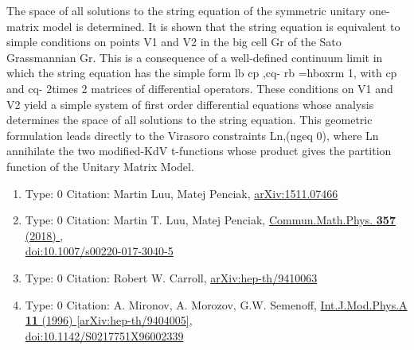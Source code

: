 \documentclass[a4paper,10pt]{article}
\begin{document}
\begin{enumerate}
The space of all solutions to the string equation of the symmetric unitary one-matrix model is determined. It is shown that the string equation is equivalent to simple conditions on points V1 and V2 in the big cell Gr of the Sato Grassmannian Gr. This is a consequence of a well-defined continuum limit in which the string equation has the simple form lb cp ,cq- rb =hbox{rm 1}, with cp and cq- 2times 2 matrices of differential operators. These conditions on V1 and V2 yield a simple system of first order differential equations whose analysis determines the space of all solutions to the string equation. This geometric formulation leads directly to the Virasoro constraints Ln,(ngeq 0), where Ln annihilate the two modified-KdV t-functions whose product gives the partition function of the Unitary Matrix Model.
\begin{enumerate}
  \item Type: 0 Citation: Martin Luu, Matej Penciak, \href{https://arxiv.org/abs/1511.07466}{arXiv:1511.07466}
  \item Type: 0 Citation: Martin T. Luu, Matej Penciak, \href{https://www.doi.org/10.1007/s00220-017-3040-5}{Commun.Math.Phys. {\bf 357} (2018) },\\\href{https://www.doi.org/10.1007/s00220-017-3040-5}{doi:10.1007/s00220-017-3040-5}
  \item Type: 0 Citation: Robert W. Carroll, \href{https://arxiv.org/abs/hep-th/9410063}{arXiv:hep-th/9410063}
  \item Type: 0 Citation: A. Mironov, A. Morozov, G.W. Semenoff, \href{https://www.doi.org/10.1142/S0217751X96002339}{Int.J.Mod.Phys.A {\bf 11} (1996) }  \href{https://arxiv.org/abs/hep-th/9404005}{[arXiv:hep-th/9404005]},\\\href{https://www.doi.org/10.1142/S0217751X96002339}{doi:10.1142/S0217751X96002339}

\end{enumerate}
\end{enumerate}
\end{document}
